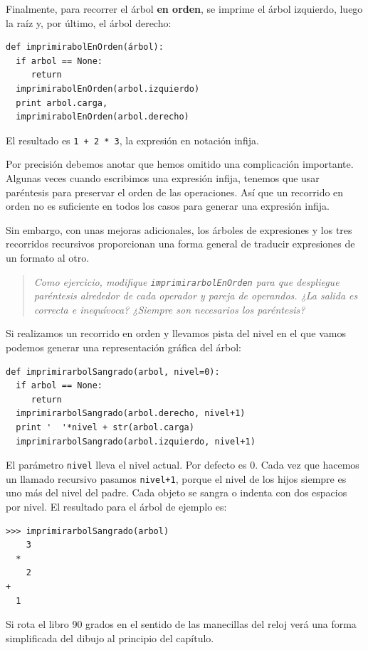 Finalmente, para recorrer el árbol {\bf en orden},
se imprime el árbol izquierdo, luego la raíz y, por último, el árbol
derecho:

\beforeverb
\begin{verbatim}
def imprimirabolEnOrden(árbol):
  if arbol == None: 
     return
  imprimirabolEnOrden(arbol.izquierdo)
  print arbol.carga,
  imprimirabolEnOrden(arbol.derecho)
\end{verbatim}
\afterverb
%
El resultado es  \texttt{1 + 2 * 3}, la expresión en notación 
infija.

Por precisión debemos anotar que hemos omitido una complicación
importante. Algunas veces cuando escribimos una expresión 
infija, tenemos que usar paréntesis para preservar el orden de
las operaciones. Así que un recorrido en orden no es suficiente
en todos los casos para generar una expresión infija.

Sin embargo, con unas mejoras adicionales, los árboles de expresiones
y los tres recorridos recursivos proporcionan una forma general
de traducir expresiones de un formato al otro.

\begin{quote}
{\em Como ejercicio, modifique \texttt{imprimirarbolEnOrden} para
que despliegue paréntesis alrededor de cada operador y pareja de
operandos. ¿La salida es correcta e inequívoca? ¿Siempre son 
necesarios los paréntesis? }
\end{quote}

Si realizamos un recorrido en orden y llevamos pista del nivel 
en el que vamos podemos generar una representación gráfica del
árbol:

\beforeverb
\begin{verbatim}
def imprimirarbolSangrado(arbol, nivel=0):
  if arbol == None: 
     return
  imprimirarbolSangrado(arbol.derecho, nivel+1)
  print '  '*nivel + str(arbol.carga)
  imprimirarbolSangrado(arbol.izquierdo, nivel+1)
\end{verbatim}
\afterverb
%
El parámetro \texttt{nivel} lleva el nivel actual. Por defecto 
es 0.  Cada vez que hacemos un llamado recursivo pasamos 
\texttt{nivel+1}, porque el nivel de los hijos siempre es uno
más del nivel del padre.  Cada objeto se sangra o indenta 
con dos espacios por nivel. El resultado para el árbol de 
ejemplo es:

\beforeverb
\begin{verbatim}
>>> imprimirarbolSangrado(arbol)
    3
  *
    2
+
  1
\end{verbatim}
\afterverb
%
Si rota el libro 90 grados en el sentido de las manecillas 
del reloj verá una forma simplificada del 
dibujo al principio del capítulo.


